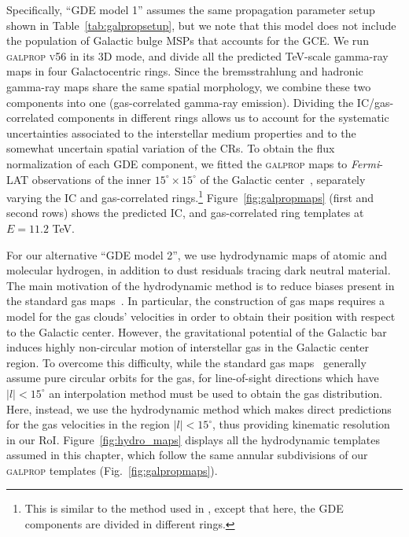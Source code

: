 \documentclass[doublespace,nopageskip]{VTthesis} %
\begin{document}
Specifically, ``GDE model 1'' assumes the same propagation parameter setup shown in Table~\ref{tab:galpropsetup}, but we note that this model does not include the population of Galactic bulge MSPs that accounts for the GCE. We run \textsc{galprop v56} in its 3D mode, and divide all the predicted TeV-scale gamma-ray maps in four Galactocentric rings. Since the bremsstrahlung and hadronic gamma-ray maps share the same spatial morphology, we combine these two components into one (gas-correlated gamma-ray emission). Dividing the IC/gas-correlated components in different rings allows us to account for the systematic uncertainties associated to the interstellar medium properties and to the somewhat uncertain spatial variation of the CRs. 
To obtain the flux normalization of each GDE component, we fitted the \textsc{galprop} maps to \textit{Fermi}-LAT observations of the inner $15^\circ \times 15^\circ$ of the Galactic center~\citep{Macias:2016nev}, separately varying the IC and gas-correlated rings.\footnote{This is similar to the method used in \cite{Rinchiuso:2020skh}, except that here, the GDE components are divided in different rings.} Figure~\ref{fig:galpropmaps} (first and second rows) shows the predicted IC, and gas-correlated ring templates at $E=11.2$ TeV. 

For our alternative ``GDE model 2'', we use hydrodynamic maps of atomic and molecular hydrogen, in addition to dust residuals tracing dark neutral material. The main motivation of the hydrodynamic method is to reduce biases present in the standard gas maps~\citep{Ackermann:2012}. In particular, the construction of gas maps requires a model for the gas clouds' velocities in order to obtain their position with respect to the Galactic center. 
However, the gravitational potential of the Galactic bar induces highly non-circular motion of interstellar gas in the Galactic center region. 
%
To overcome this difficulty, while the standard gas maps~\citep{Ackermann:2012} generally assume pure circular orbits for the gas, for line-of-sight directions which have $\lvert l \rvert < 15^\circ $ an interpolation method must be used to obtain the gas distribution. 
%
Here, instead, we use the hydrodynamic method \citep{Pohl2008,Macias:2016nev} which makes direct predictions for the gas velocities in the region $\lvert l \rvert < 15^\circ $, thus providing kinematic resolution in our RoI. Figure~\ref{fig:hydro_maps} displays all the hydrodynamic templates assumed in this chapter, which follow the same annular subdivisions of our \textsc{galprop} templates (Fig.~\ref{fig:galpropmaps}).
\end{document}
